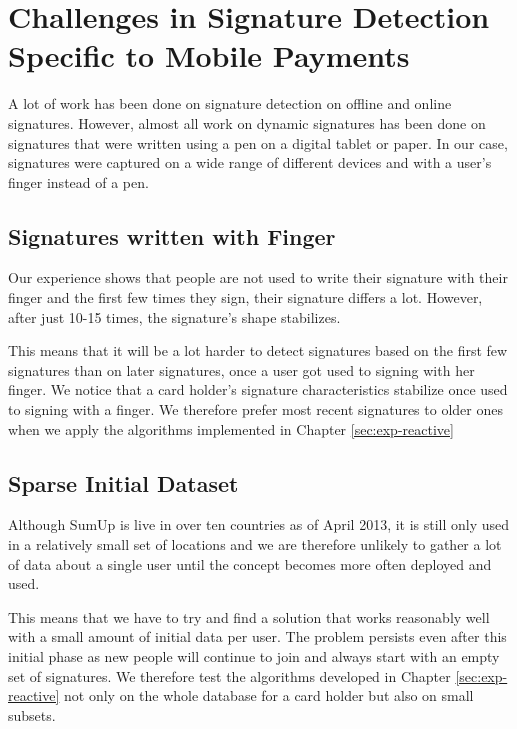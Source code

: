 \documentclass[a4paper, oneside]{csthesis}
\begin{document}
\section{Challenges in Signature Detection Specific to Mobile Payments}

A lot of work has been done on signature detection on offline and online signatures. However, almost all work on dynamic signatures has been done on signatures that were written using a pen on a digital tablet or paper. In our case, signatures were captured on a wide range of different devices and with a user's finger instead of a pen.

\subsection{Signatures written with Finger}

Our experience shows that people are not used to write their signature with their finger and the first few times they sign, their signature differs a lot. However, after just 10-15 times, the signature's shape stabilizes.

This means that it will be a lot harder to detect signatures based on the first few signatures than on later signatures, once a user got used to signing with her finger.
We notice that a card holder's signature characteristics stabilize once used to signing with a finger. We therefore prefer most recent signatures to older ones when we apply the algorithms implemented in Chapter \ref{sec:exp-reactive}

\subsection{Sparse Initial Dataset}

Although SumUp is live in over ten countries as of April 2013, it is still only used in a relatively small set of locations and we are therefore unlikely to gather a lot of data about a single user until the concept becomes more often deployed and used.

This means that we have to try and find a solution that works reasonably well with a small amount of initial data per user. The problem persists even after this initial phase as new people will continue to join and always start with an empty set of signatures. We therefore test the algorithms developed in Chapter \ref{sec:exp-reactive} not only on the whole database for a card holder but also on small subsets.
\end{document}
